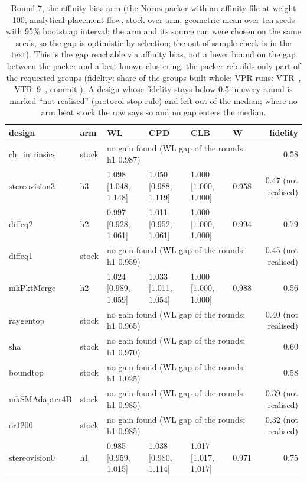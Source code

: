 \begin{table}[t]
\caption{Round 7, the affinity-bias arm (the Norns packer with an affinity file at weight 100, analytical-placement flow, stock over arm, geometric mean over ten seeds with 95\% bootstrap interval; the arm and its source run were chosen on the same seeds, so the gap is optimistic by selection; the out-of-sample check is in the text). This is the gap reachable via affinity bias, not a lower bound on the gap between the packer and a best-known clustering: the packer rebuilds only part of the requested groups (fidelity: share of the groups built whole; VPR runs: VTR~\cite{rose2012vtr}, VTR~9~\cite{elgammal2025vtr9}, commit ). A design whose fidelity stays below 0.5 in every round is marked ``not realised'' (protocol stop rule) and left out of the median; where no arm beat stock the row says so and no gap enters the median.}
\label{tab:r7gapaff}
\centering\scriptsize
\begin{tabular}{@{}llllllr@{}}
\toprule
design & arm & WL & CPD & CLB & W & fidelity \\
\midrule
ch\_intrinsics & stock & \multicolumn{4}{l}{no gain found (WL gap of the rounds: h1 0.987)} & 0.58 \\
stereovision3 & h3 & 1.098 [1.048, 1.148] & 1.050 [0.988, 1.119] & 1.000 [1.000, 1.000] & 0.958 & 0.47 (not realised) \\
diffeq2 & h2 & 0.997 [0.928, 1.061] & 1.011 [0.952, 1.061] & 1.000 [1.000, 1.000] & 0.994 & 0.79 \\
diffeq1 & stock & \multicolumn{4}{l}{no gain found (WL gap of the rounds: h1 0.959)} & 0.45 (not realised) \\
mkPktMerge & h2 & 1.024 [0.989, 1.059] & 1.033 [1.011, 1.054] & 1.000 [1.000, 1.000] & 0.988 & 0.56 \\
raygentop & stock & \multicolumn{4}{l}{no gain found (WL gap of the rounds: h1 0.965)} & 0.40 (not realised) \\
sha & stock & \multicolumn{4}{l}{no gain found (WL gap of the rounds: h1 0.970)} & 0.60 \\
boundtop & stock & \multicolumn{4}{l}{no gain found (WL gap of the rounds: h1 1.025)} & 0.58 \\
mkSMAdapter4B & stock & \multicolumn{4}{l}{no gain found (WL gap of the rounds: h1 0.985)} & 0.39 (not realised) \\
or1200 & stock & \multicolumn{4}{l}{no gain found (WL gap of the rounds: h1 0.985)} & 0.32 (not realised) \\
stereovision0 & h1 & 0.985 [0.959, 1.015] & 1.038 [0.980, 1.114] & 1.017 [1.017, 1.017] & 0.971 & 0.75 \\

\end{tabular}
\end{table}
